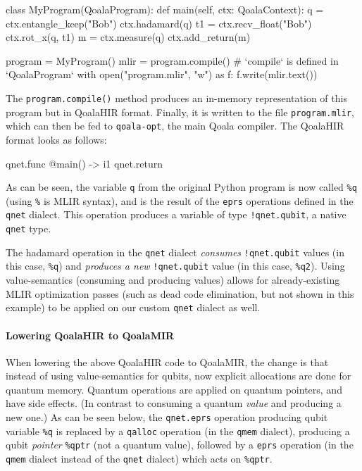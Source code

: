 \begin{pycode}
class MyProgram(QoalaProgram):
    def main(self, ctx: QoalaContext):
        q = ctx.entangle_keep("Bob")
        ctx.hadamard(q)
        t1 = ctx.recv_float("Bob")
        ctx.rot_x(q, t1)
        m = ctx.measure(q)
        ctx.add_return(m)

program = MyProgram()
mlir = program.compile()  # `compile` is defined in `QoalaProgram`
with open("program.mlir", "w") as f:
    f.write(mlir.text())
\end{pycode}

The \texttt{program.compile()} method produces an in-memory representation of this program but in QoalaHIR format.
Finally, it is written to the file \texttt{program.mlir}, which can then be fed to \texttt{qoala-opt}, the main Qoala compiler.
The QoalaHIR format looks as follows:

\begin{pycode}
qnet.func @main() -> i1 {
    qnet.return %
}
\end{pycode}

As can be seen, the variable \texttt{q} from the original Python program is now called \texttt{\%q} (using \texttt{\%} is MLIR syntax), and is the result of the \texttt{eprs} operations defined in the \texttt{qnet} dialect.
This operation produces a variable of type \texttt{!qnet.qubit}, a native \texttt{qnet} type.

The hadamard operation in the \texttt{qnet} dialect \emph{consumes} \texttt{!qnet.qubit} values (in this case, \texttt{\%q}) and \emph{produces a new} \texttt{!qnet.qubit} value (in this case, \texttt{\%q2}).
Using value-semantics (consuming and producing values) allows for already-existing MLIR optimization passes (such as dead code elimination, but not shown in this example) to be applied on our custom \texttt{qnet} dialect as well.

\paragraph{Lowering QoalaHIR to QoalaMIR}

When lowering the above QoalaHIR code to QoalaMIR, the change is that instead of using value-semantics for qubits, now explicit allocations are done for quantum memory.
Quantum operations are applied on quantum pointers, and have side effects.
(In contrast to consuming a quantum \emph{value} and producing a new one.)
As can be seen below, the \texttt{qnet.eprs} operation producing qubit variable \texttt{\%q} is replaced by a \texttt{qalloc} operation (in the \texttt{qmem} dialect), producing a qubit \emph{pointer} \texttt{\%qptr} (not a quantum value), followed by a \texttt{eprs} operation (in the \texttt{qmem} dialect instead of the \texttt{qnet} dialect) which acts on \texttt{\%qptr}.

